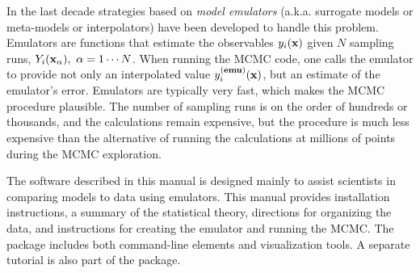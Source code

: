 In the last decade strategies based on {\it model emulators} (a.k.a. surrogate models or meta-models or interpolators) have been developed to handle this problem. Emulators are functions that estimate the observables $y_i({\bf x})$ given $N$ sampling runs, $Y_i({\bf x}_\alpha),~\alpha=1\cdots N$. When running the MCMC code, one calls the emulator to provide not only an interpolated value $y_i^{\bf(emu)}({\bf x})$, but an estimate of the emulator's error. Emulators are typically very fast, which makes the MCMC procedure plausible. The number of sampling runs is on the order of hundreds or thousands, and the calculations remain expensive, but the procedure is much less expensive than the alternative of running the calculations at millions of points during the MCMC exploration.

The software described in this manual is designed mainly to assist scientists in comparing models to data using emulators. This manual provides installation instructions, a summary of the statistical theory, directions for organizing the data, and instructions for creating the emulator and running the MCMC. The package includes both command-line elements and visualization tools. A separate tutorial is also part of the package.